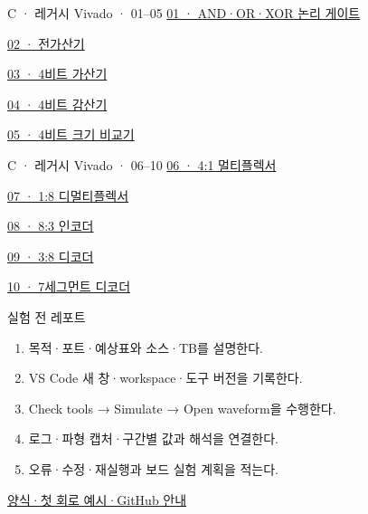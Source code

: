 \begin{frame}[label=lab1-legacy]{C · 레거시 Vivado · 01–05}\relax
\small
\href{04.LAB1_11_LOGIC_GATES_LEGACY.pdf}{01 · AND·OR·XOR 논리 게이트}\par\vspace{0.35cm}
\href{04.LAB1_12_FULL_ADDER_LEGACY.pdf}{02 · 전가산기}\par\vspace{0.35cm}
\href{04.LAB1_13_ADDER4_LEGACY.pdf}{03 · 4비트 가산기}\par\vspace{0.35cm}
\href{04.LAB1_14_SUBTRACTOR4_LEGACY.pdf}{04 · 4비트 감산기}\par\vspace{0.35cm}
\href{04.LAB1_15_COMPARATOR4_LEGACY.pdf}{05 · 4비트 크기 비교기}\par\vspace{0.35cm}

\end{frame}

\begin{frame}{C · 레거시 Vivado · 06–10}\relax
\small
\href{04.LAB1_16_MUX4TO1_LEGACY.pdf}{06 · 4:1 멀티플렉서}\par\vspace{0.35cm}
\href{04.LAB1_17_DEMUX1TO8_LEGACY.pdf}{07 · 1:8 디멀티플렉서}\par\vspace{0.35cm}
\href{04.LAB1_18_ENCODER8TO3_LEGACY.pdf}{08 · 8:3 인코더}\par\vspace{0.35cm}
\href{04.LAB1_19_DECODER3TO8_LEGACY.pdf}{09 · 3:8 디코더}\par\vspace{0.35cm}
\href{04.LAB1_20_SEVEN_SEGMENT_LEGACY.pdf}{10 · 7세그먼트 디코더}\par\vspace{0.35cm}

\end{frame}

\begin{frame}[label=lab1-reports]{실험 전 레포트}\relax
\small
\begin{enumerate}\setlength{\itemsep}{0.22cm}
\item 목적·포트·예상표와 소스·TB를 설명한다.
\item VS Code 새 창·workspace·도구 버전을 기록한다.
\item Check tools → Simulate → Open waveform을 수행한다.
\item 로그·파형 캡처·구간별 값과 해석을 연결한다.
\item 오류·수정·재실행과 보드 실험 계획을 적는다.
\end{enumerate}
\href{https://github.com/Glaysia/ece2_26_2_2/blob/daily/0910/example/fpga_projects_hdl/LAB1/docs/reports.md}{양식·첫 회로 예시·GitHub 안내}
\end{frame}

